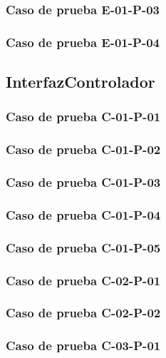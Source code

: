 \documentclass[10pt,a4paper]{article}
\begin{document}
			\subsubsection{Caso de prueba E-01-P-03}

			\subsubsection{Caso de prueba E-01-P-04}

	\subsection{InterfazControlador}
			\subsubsection{Caso de prueba C-01-P-01}

			\subsubsection{Caso de prueba C-01-P-02}

			\subsubsection{Caso de prueba C-01-P-03}

			\subsubsection{Caso de prueba C-01-P-04}

			\subsubsection{Caso de prueba C-01-P-05}

			\subsubsection{Caso de prueba C-02-P-01}

			\subsubsection{Caso de prueba C-02-P-02}

			\subsubsection{Caso de prueba C-03-P-01}
\end{document}
